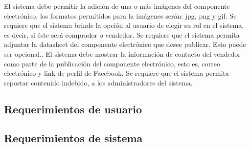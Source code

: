 \begin{cdtRequirements}
	    {El sistema debe permitir la adición de una o más imágenes del componente electrónico, los formatos permitidos para la imágenes serán: jpg, png y gif.}
	    {Se requiere que el sistema brinde la opción al usuario de elegir su rol en el sistema, es decir, si éste será comprador o vendedor.}
	    {Se requiere que el sistema permita adjuntar la datasheet del componente electrónico que desee publicar. Esto puede ser opcional..}
	    {El sistema debe mostrar la información de contacto del vendedor como parte de la publicación del componente electrónico, esto es, correo electrónico y link de perfil de Facebook.}
	    {Se requiere que el sistema permita reportar contenido indebido, a los administradores del sistema.}
	
\end{cdtRequirements}

\subsection{Requerimientos de usuario}

\subsection{Requerimientos de sistema}

%	



